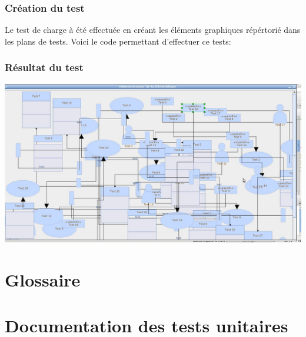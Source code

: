\documentclass[12pt,a4paper,openany]{report}
\begin{document}
	\subsection{Création du test}
	Le test de charge à été effectuée en créant les éléments graphiques répértorié dans les plans de tests. Voici le code permettant d'effectuer ce tests:
	
	\subsection{Résultat du test}
	\includegraphics[width=25cm, angle=90]{testCharge.jpg}
	\closeout\glossaireVar
	\appendix	
	\chapter{Glossaire} \label{glossaire}
	\begin{sortedlist}
		
	\end{sortedlist}

	\chapter{Documentation des tests unitaires}
	\label{junitdoc}
	
\end{document}

